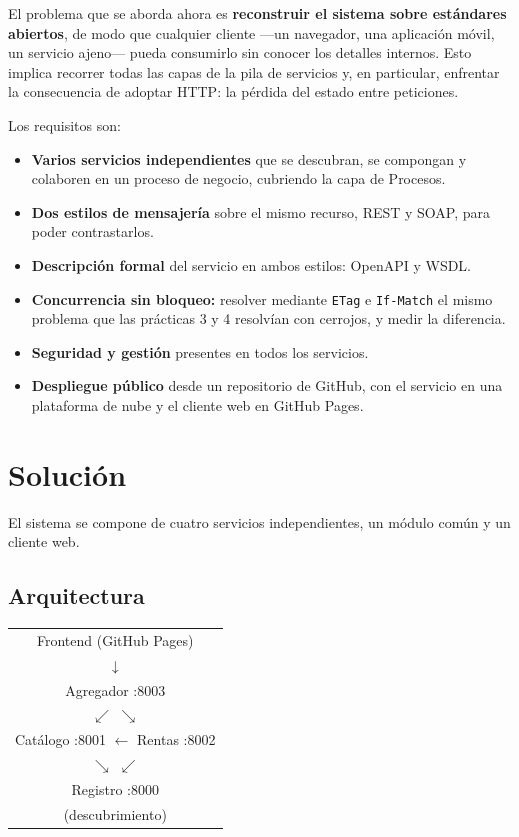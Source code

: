 \documentclass[12pt]{article}
\begin{document}
El problema que se aborda ahora es \textbf{reconstruir el sistema sobre estándares abiertos}, de modo que cualquier cliente —un navegador, una aplicación móvil, un servicio ajeno— pueda consumirlo sin conocer los detalles internos. Esto implica recorrer todas las capas de la pila de servicios y, en particular, enfrentar la consecuencia de adoptar HTTP: la pérdida del estado entre peticiones.

Los requisitos son:

\begin{itemize}[itemsep=2pt]
    \item \textbf{Varios servicios independientes} que se descubran, se compongan y colaboren en un proceso de negocio, cubriendo la capa de Procesos.
    \item \textbf{Dos estilos de mensajería} sobre el mismo recurso, REST y SOAP, para poder contrastarlos.
    \item \textbf{Descripción formal} del servicio en ambos estilos: OpenAPI y WSDL.
    \item \textbf{Concurrencia sin bloqueo:} resolver mediante \texttt{ETag} e \texttt{If-Match} el mismo problema que las prácticas 3 y 4 resolvían con cerrojos, y medir la diferencia.
    \item \textbf{Seguridad y gestión} presentes en todos los servicios.
    \item \textbf{Despliegue público} desde un repositorio de GitHub, con el servicio en una plataforma de nube y el cliente web en GitHub Pages.
\end{itemize}

\section{Solución}

El sistema se compone de cuatro servicios independientes, un módulo común y un cliente web.

\subsection{Arquitectura}

\begin{center}
\ttfamily
\begin{tabular}{c}
Frontend (GitHub Pages) \\
$\downarrow$ \\
Agregador :8003 \\
$\swarrow$ \qquad $\searrow$ \\
Catálogo :8001 \quad $\longleftarrow$ \quad Rentas :8002 \\
$\searrow$ \qquad $\swarrow$ \\
Registro :8000 \\
(descubrimiento) \\
\end{tabular}
\end{center}
\end{document}
